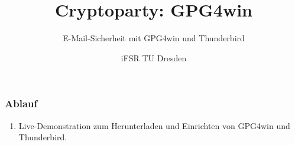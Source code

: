 \documentclass{beamer}
\title{Cryptoparty: GPG4win}
\subtitle{E-Mail-Sicherheit mit GPG4win und Thunderbird}
\author{iFSR TU Dresden}
\begin{document}
\begin{frame}
  \maketitle
\end{frame}

\begin{frame}
  \frametitle{Ablauf}
  \begin{enumerate}
  \item Live-Demonstration zum Herunterladen und Einrichten von GPG4win und
    Thunderbird.
  \end{enumerate}
\end{frame}
\end{document}
